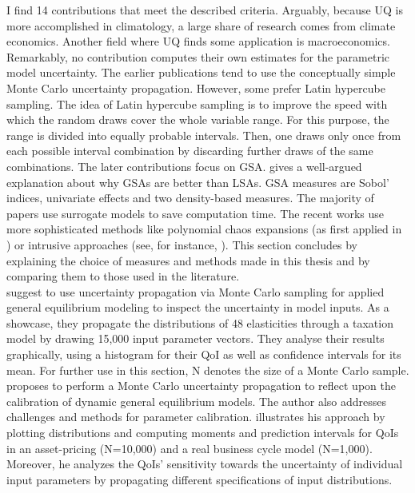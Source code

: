 I find 14 contributions that meet the described criteria. Arguably, because UQ is more accomplished in climatology, a large share of research comes from climate economics. Another field where UQ finds some application is macroeconomics. Remarkably, no contribution computes their own estimates for the parametric model uncertainty. The earlier publications tend to use the conceptually simple Monte Carlo uncertainty propagation. However, some prefer Latin hypercube sampling. The idea of Latin hypercube sampling is to improve the speed with which the random draws cover the whole variable range. For this purpose, the range is divided into equally probable intervals. Then, one draws only once from each possible interval combination by discarding further draws of the same combinations. The later contributions focus on GSA. \cite{Harenberg.2019} gives a well-argued explanation about why GSAs are better than LSAs. GSA measures are Sobol' indices, univariate effects and two density-based measures. The majority of papers use surrogate models to save computation time. The recent works use more sophisticated methods like polynomial chaos expansions (as first applied in \cite{Harenberg.2019}) or intrusive approaches (see, for instance, \cite{Scheidegger.2019}). This section concludes by explaining the choice of measures and methods made in this thesis and by comparing them to those used in the literature.\\
\newline
\cite{Harrison.1992} suggest to use uncertainty propagation via Monte Carlo sampling for applied general equilibrium modeling to inspect the uncertainty in model inputs. As a showcase, they propagate the distributions of 48 elasticities through a taxation model by drawing 15,000 input parameter vectors. They analyse their results graphically, using a histogram for their QoI as well as confidence intervals for its mean. For further use in this section, N denotes the size of a Monte Carlo sample.\\
\newline
\cite{Canova.1994} proposes to perform a Monte Carlo uncertainty propagation to reflect upon the calibration of dynamic general equilibrium models. The author also addresses challenges and methods for parameter calibration. \citeauthor{Canova.1994} illustrates his approach by plotting distributions and computing moments and prediction intervals for QoIs in an asset-pricing (N=10,000) and a real business cycle model (N=1,000). Moreover, he analyzes the QoIs' sensitivity towards the uncertainty of individual input parameters by propagating different specifications of input distributions.\\

